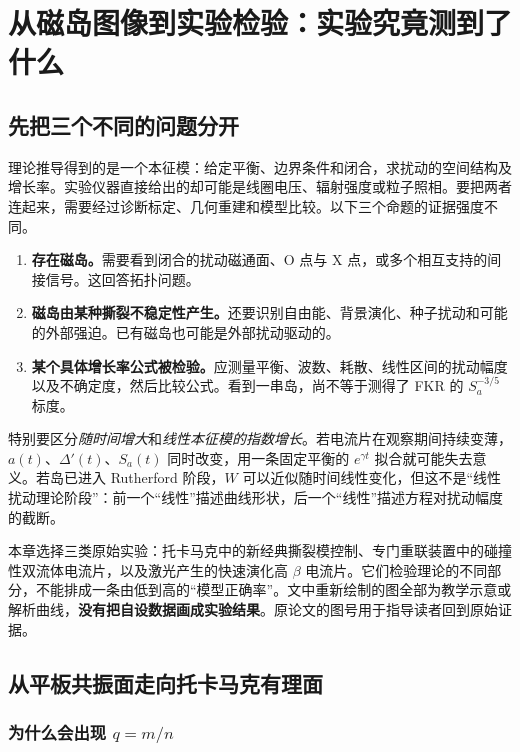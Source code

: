 \chapter{从磁岛图像到实验检验：实验究竟测到了什么}
\label{tm:chap:experiments}

\section{先把三个不同的问题分开}

理论推导得到的是一个本征模：给定平衡、边界条件和闭合，求扰动的空间结构及增长率。实验仪器直接给出的却可能是线圈电压、辐射强度或粒子照相。要把两者连起来，需要经过诊断标定、几何重建和模型比较。以下三个命题的证据强度不同。

\begin{enumerate}
  \item \textbf{存在磁岛。}需要看到闭合的扰动磁通面、O 点与 X 点，或多个相互支持的间接信号。这回答拓扑问题。
  \item \textbf{磁岛由某种撕裂不稳定性产生。}还要识别自由能、背景演化、种子扰动和可能的外部强迫。已有磁岛也可能是外部扰动驱动的。
  \item \textbf{某个具体增长率公式被检验。}应测量平衡、波数、耗散、线性区间的扰动幅度以及不确定度，然后比较公式。看到一串岛，尚不等于测得了 FKR 的 $S_a^{-3/5}$ 标度。
\end{enumerate}

特别要区分\emph{随时间增大}和\emph{线性本征模的指数增长}。若电流片在观察期间持续变薄，$a(t)$、$\Delta'(t)$、$S_a(t)$ 同时改变，用一条固定平衡的 $e^{\gamma t}$ 拟合就可能失去意义。若岛已进入 Rutherford 阶段，$W$ 可以近似随时间线性变化，但这不是“线性扰动理论阶段”：前一个“线性”描述曲线形状，后一个“线性”描述方程对扰动幅度的截断。

本章选择三类原始实验：托卡马克中的新经典撕裂模控制、专门重联装置中的碰撞性双流体电流片，以及激光产生的快速演化高 $\beta$ 电流片。它们检验理论的不同部分，不能排成一条由低到高的“模型正确率”。文中重新绘制的图全部为教学示意或解析曲线，\textbf{没有把自设数据画成实验结果}。原论文的图号用于指导读者回到原始证据。

\section{从平板共振面走向托卡马克有理面}

\subsection{为什么会出现 \texorpdfstring{$q=m/n$}{q=m/n}}

